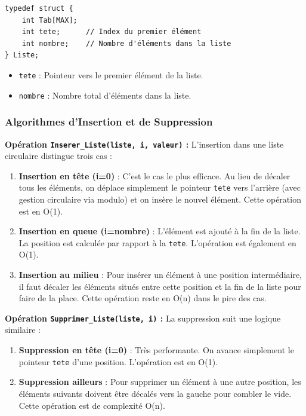 \documentclass[a4paper, 11pt]{article}
\begin{document}
\begin{lstlisting}
typedef struct {
    int Tab[MAX];
    int tete;      // Index du premier élément
    int nombre;    // Nombre d'éléments dans la liste
} Liste;
\end{lstlisting}

\begin{itemize}
    \item \texttt{tete} : Pointeur vers le premier élément de la liste.
    \item \texttt{nombre} : Nombre total d'éléments dans la liste.
\end{itemize}

\subsubsection*{Algorithmes d'Insertion et de Suppression}

\textbf{Opération \texttt{Inserer\_Liste(liste, i, valeur)} :}
L'insertion dans une liste circulaire distingue trois cas :

\begin{enumerate}
    \item \textbf{Insertion en tête (i=0)} : C'est le cas le plus efficace. Au lieu de décaler tous les éléments, on déplace simplement le pointeur \texttt{tete} vers l'arrière (avec gestion circulaire via modulo) et on insère le nouvel élément. Cette opération est en O(1).
    \item \textbf{Insertion en queue (i=nombre)} : L'élément est ajouté à la fin de la liste. La position est calculée par rapport à la \texttt{tete}. L'opération est également en O(1).
    \item \textbf{Insertion au milieu} : Pour insérer un élément à une position intermédiaire, il faut décaler les éléments situés entre cette position et la fin de la liste pour faire de la place. Cette opération reste en O(n) dans le pire des cas.
\end{enumerate}

\textbf{Opération \texttt{Supprimer\_Liste(liste, i)} :}
La suppression suit une logique similaire :

\begin{enumerate}
    \item \textbf{Suppression en tête (i=0)} : Très performante. On avance simplement le pointeur \texttt{tete} d'une position. L'opération est en O(1).
    \item \textbf{Suppression ailleurs} : Pour supprimer un élément à une autre position, les éléments suivants doivent être décalés vers la gauche pour combler le vide. Cette opération est de complexité O(n).
\end{enumerate}
\end{document}
